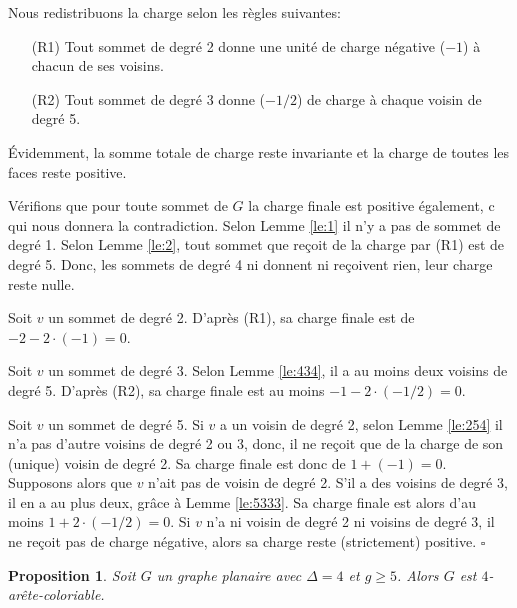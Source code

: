 \documentclass[10pt,a4paper]{article}
\newtheorem{proposition}{Proposition}
\newcommand{\ep}{{\hfill $\square$}}
\begin{document}
Nous redistribuons la charge selon les règles suivantes:
\begin{enumerate}
\item[(R1)] Tout sommet de degré 2 donne une unité de charge négative ($-1$) à chacun de ses voisins.
\item[(R2)] Tout sommet de degré 3 donne ($-1/2$) de charge à chaque voisin de degré 5.
\end{enumerate}

Évidemment, la somme totale de charge reste invariante et la charge de toutes les faces reste positive.

Vérifions que pour toute sommet de $G$ la charge finale est positive également, c qui nous donnera la contradiction.
Selon Lemme \ref{le:1} il n'y a pas de sommet de degré 1.
Selon Lemme \ref{le:2}, tout sommet que reçoit de la charge par (R1) est de degré 5. Donc, les sommets de degré 4 ni donnent ni reçoivent rien, leur charge reste nulle.

Soit $v$ un sommet de degré 2. D'après (R1), sa charge finale est de $-2 - 2\cdot (-1)=0$.

Soit $v$ un sommet de degré 3. Selon Lemme \ref{le:434}, il a au moins deux voisins de degré 5. D'après (R2), sa charge finale est au moins $-1 - 2\cdot (-1/2) = 0$.

Soit $v$ un sommet de degré 5. Si $v$ a un voisin de degré 2, selon Lemme \ref{le:254} il n'a pas d'autre voisins de degré 2 ou 3, donc, il ne reçoit que de la charge de son (unique) voisin de degré 2. Sa charge finale est donc de $1+(-1)=0$.
Supposons alors que $v$ n'ait pas de voisin de degré 2. S'il a des voisins de degré 3, il en a au plus deux, grâce à Lemme \ref{le:5333}. Sa charge finale est alors d'au moins $1+2\cdot(-1/2) = 0$. Si $v$ n'a ni voisin de degré 2 ni voisins de degré 3, il ne reçoit pas de charge négative, alors sa charge reste (strictement) positive.
\ep



\begin{proposition}
Soit $G$ un graphe planaire avec $\Delta = 4$ et $g \geq 5$. Alors $G$ est $4$-arête-coloriable.
\end{proposition}
\end{document}

